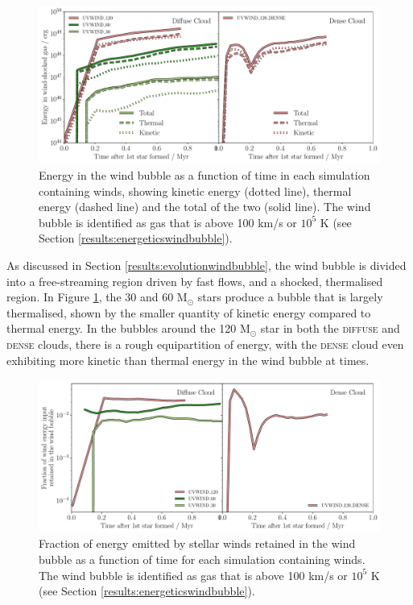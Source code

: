 \documentclass[a4paper,fleqn,usenatbib]{mnras}
\newcommand{\Msolar}{M$_{\odot}$\xspace}
\begin{document}
\begin{figure}
	\includegraphics[width=1.98\columnwidth]{plots/fig6a.pdf}
	\caption{Energy in the wind bubble as a function of time in each simulation containing winds, showing kinetic energy (dotted line), thermal energy (dashed line) and the total of the two (solid line). The wind bubble is identified as gas that is above 100 km/s or $10^5$ K (see Section \protect\ref{results:energeticswindbubble}).}
	\label{fig:windenergy}
\end{figure}

As discussed in Section \ref{results:evolutionwindbubble}, the wind bubble is divided into a free-streaming region driven by fast flows, and a shocked, thermalised region. In Figure \ref{fig:windenergy}, the 30 and 60 \Msolar stars produce a bubble that is largely thermalised, shown by the smaller quantity of kinetic energy compared to thermal energy. In the bubbles around the 120 \Msolar star in both the \textsc{diffuse} and \textsc{dense} clouds, there is a rough equipartition of energy, with the \textsc{dense} cloud even exhibiting more kinetic than thermal energy in the wind bubble at times.

\begin{figure}
	\includegraphics[width=1.98\columnwidth]{plots/fig7a.pdf}
	\caption{Fraction of energy emitted by stellar winds retained in the wind bubble as a function of time for each simulation containing winds. The wind bubble is identified as gas that is above 100 km/s or $10^5$ K (see Section \protect\ref{results:energeticswindbubble}).}
	\label{fig:windenergyretained}
\end{figure}
\end{document}
